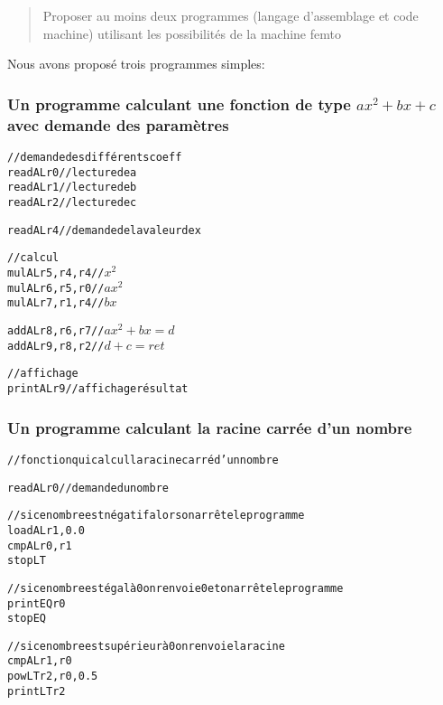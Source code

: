 \documentclass[11pt,a4paper]{article}
\begin{document}
\begin{quote}
Proposer au moins deux programmes (langage d’assemblage et code machine) utilisant les possibilités
de la machine femto
\end{quote}

Nous avons proposé trois programmes simples:

\subsubsection*{Un programme calculant une fonction de type $ ax^{2} + bx + c $ avec demande des paramètres}

\begin{alltt}
// demande des différents coeff
readAL r0 //lecture de a
readAL r1 //lecture de b
readAL r2 //lecture de c

readAL r4 // demande de la valeur de x

// calcul
mulAL r5,r4,r4 // \begin{math} x^2 \end{math}
mulAL r6,r5,r0 // \begin{math} ax^2 \end{math}
mulAL r7,r1,r4 // \begin{math} bx \end{math}

addAL r8,r6,r7 // \begin{math} ax^2 + bx = d \end{math}
addAL r9,r8,r2 // \begin{math} d + c = ret \end{math}

//affichage
printAL r9 //affichage résultat
\end{alltt}


\subsubsection*{Un programme calculant la racine carrée d'un nombre}

\begin{alltt}
// fonction qui calcul la racine carré d'un nombre

readAL r0 //demande du nombre

//si ce nombre est négatif alors on arrête le programme
loadAL r1, 0.0
cmpAL r0, r1
stopLT

//si ce nombre est égal à 0 on renvoie 0 et on arrête le programme
printEQ r0
stopEQ

//si ce nombre est supérieur à 0 on renvoie la racine
cmpAL r1, r0
powLT r2,r0, 0.5
printLT r2
\end{alltt}
\end{document}
